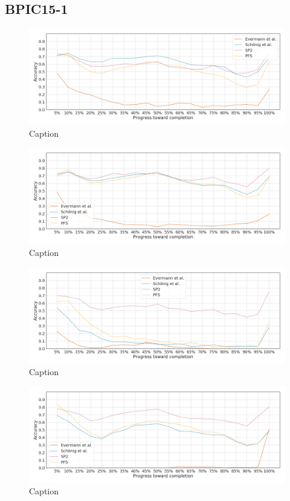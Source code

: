 \subsection{BPIC15-1}
\begin{figure}[!htb]
    \centering
    \includegraphics[width=\textwidth]{gfx/bpic2015_1/individual_stability.png}
    \caption{Caption}
    \label{fig:my_label}
\end{figure}
\begin{figure}[!htb]
    \centering
    \includegraphics[width=\textwidth]{gfx/bpic2015_1/grouped_stability.png}
    \caption{Caption}
    \label{fig:my_label}
\end{figure}
\begin{figure}[!htb]
    \centering
    \includegraphics[width=\textwidth]{gfx/bpic2015_1/padded_stability.png}
    \caption{Caption}
    \label{fig:my_label}
\end{figure}
\begin{figure}[!htb]
    \centering
    \includegraphics[width=\textwidth]{gfx/bpic2015_1/windowed_stability.png}
    \caption{Caption}
    \label{fig:my_label}
\end{figure}

